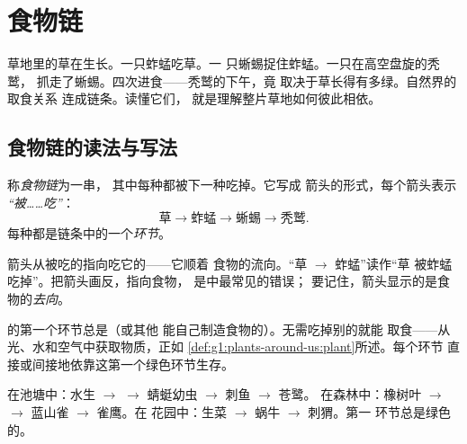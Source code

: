 \chapter{食物链}\label{ch:g3:food-chains}

草地里的草在生长。一只蚱蜢吃草。一
只蜥蜴捉住蚱蜢。一只在高空盘旋的秃鹫，
抓走了蜥蜴。四次进食——秃鹫的下午，竟
取决于草长得有多绿。自然界的取食关系
连成链条。读懂它们，
就是理解整片草地如何彼此相依。

\section{食物链的读法与写法}

\begin{definition}[食物链]\label{def:g3:food-chains:chain}
称\emph{食物链}为一串，
其中每种都被下一种吃掉。它写成
箭头的形式，每个箭头表示
\emph{“被……吃”}：
\[
\text{草} \longrightarrow \text{蚱蜢}
\longrightarrow \text{蜥蜴} \longrightarrow \text{秃鹫}.
\]
每种都是链条中的一个\emph{环节}。
\end{definition}

\begin{remark}[注意箭头的方向]\label{rem:g3:food-chains:arrow}
箭头从被吃的指向吃它的——它顺着
食物的流向。“草 $\rightarrow$ 蚱蜢”读作“草
被蚱蜢吃掉”。把箭头画反，指向食物，
是中最常见的错误；
要记住，箭头显示的是食物的\emph{去向}。
\end{remark}

\begin{proposition}[每条食物链都从植物开始]\label{prop:g3:food-chains:start}
的第一个环节总是（或其他
能自己制造食物的）。无需吃掉别的就能
取食——从光、水和空气中获取物质，正如
\cref{def:g1:plants-around-us:plant}所述。每个环节
直接或间接地依靠这第一个绿色环节生存。
\end{proposition}
\admitted

\begin{example}[三个栖息地中的食物链]\label{ex:g3:food-chains:three}
在池塘中：水生 $\rightarrow$  $\rightarrow$
蜻蜓幼虫 $\rightarrow$ 刺鱼 $\rightarrow$ 苍鹭。
在森林中：橡树叶 $\rightarrow$ 
$\rightarrow$ 蓝山雀 $\rightarrow$ 雀鹰。在
花园中：生菜 $\rightarrow$ 蜗牛 $\rightarrow$ 刺猬。第一
环节总是绿色的。
\end{example}

